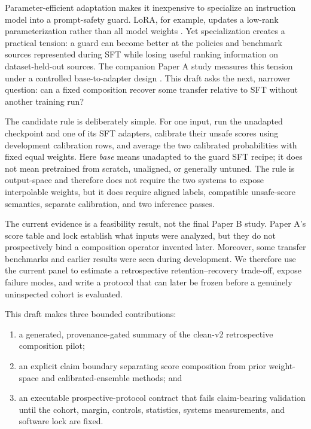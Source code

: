 \documentclass[11pt]{article}
\begin{document}
Parameter-efficient adaptation makes it inexpensive to specialize an instruction model into a
prompt-safety guard.  LoRA, for example, updates a low-rank parameterization rather than all model
weights \citep{hu2021lora}.  Yet specialization creates a practical tension: a guard can become
better at the policies and benchmark sources represented during SFT while losing useful ranking
information on dataset-held-out sources.  The companion Paper A study measures this tension under
a controlled base-to-adapter design \citep{rahimi2026benchmark}.  This draft asks the next, narrower
question: can a fixed composition recover some transfer relative to SFT without another training
run?

The candidate rule is deliberately simple.  For one input, run the unadapted checkpoint and one
of its SFT adapters, calibrate their unsafe scores using development calibration rows, and average
the two calibrated probabilities with fixed equal weights.  Here \emph{base} means unadapted to
the guard SFT recipe; it does not mean pretrained from scratch, unaligned, or generally untuned.
The rule is output-space and therefore does not require the two systems to expose interpolable
weights, but it does require aligned labels, compatible unsafe-score semantics, separate
calibration, and two inference passes.

The current evidence is a feasibility result, not the final Paper B study.  Paper A's score table
and lock establish what inputs were analyzed, but they do not prospectively bind a composition
operator invented later.  Moreover, some transfer benchmarks and earlier results were seen during
development.  We therefore use the current panel to estimate a retrospective retention--recovery
trade-off, expose failure modes, and write a protocol that can later be frozen before a genuinely
uninspected cohort is evaluated.

This draft makes three bounded contributions:

\begin{enumerate}[leftmargin=1.5em]
  \item a generated, provenance-gated summary of the clean-v2 retrospective composition pilot;
  \item an explicit claim boundary separating score composition from prior weight-space and
        calibrated-ensemble methods; and
  \item an executable prospective-protocol contract that fails claim-bearing validation until
        the cohort, margin, controls, statistics, systems measurements, and software lock are fixed.
\end{enumerate}
\end{document}
